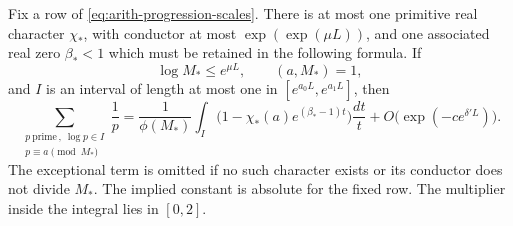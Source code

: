 \begin{lemma}\label{lem:arith-progression}
Fix a row of \eqref{eq:arith-progression-scales}. There is at most one
primitive real character $\chi_*$, with conductor at most
$\exp(\exp(\mu L))$, and one associated real zero $\beta_*<1$ which must
be retained in the following formula. If
\[
 \log M_*\leq e^{\mu L},\qquad (a,M_*)=1,
\]
and $I$ is an interval of length at most one in
$[e^{a_0L},e^{a_1L}]$, then
\begin{equation}\label{eq:src57}
 \sum_{\substack{p\ \text{prime}\,,\ \log p\in I\\p\equiv a\pmod{M_*}}}
       \frac1p
 =\frac1{\phi(M_*)}\int_I
       \bigl(1-\chi_*(a)e^{(\beta_*-1)t}\bigr)\frac{dt}{t}
   +O\bigl(\exp(-c e^{\delta'L})\bigr).
\end{equation}
The exceptional term is omitted if no such character exists or its conductor
does not divide $M_*$. The implied constant is absolute for the fixed row.
The multiplier inside the integral lies in $[0,2]$.
\end{lemma}

